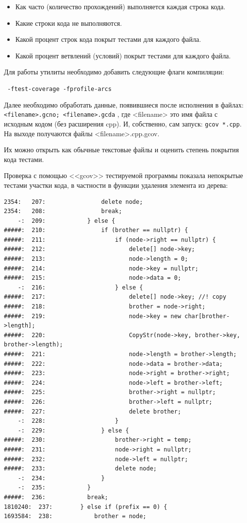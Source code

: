 \documentclass[12pt]{article}
\begin{document}
\begin{itemize}
\item Как часто (количество прохождений) выполняется каждая строка кода.
\item Какие строки кода не выполняются.
\item Какой процент строк кода покрыт тестами для каждого файла.
\item Какой процент ветвлений (условий) покрыт тестами для каждого файла.
\end{itemize}

Для работы утилиты необходимо добавить следующие флаги компиляции:

\lstinline| -ftest-coverage -fprofile-arcs|

Далее необходимо обработать данные, появившиеся после исполнения в файлах: \lstinline|<filename>.gcno; <filename>.gcda| , где <filename> это имя файла с исходным кодом (без расширения cpp). И, собственно, сам запуск: \lstinline|gcov *.cpp|.
На выходе получаются файлы <filename>.cpp.gcov.

Их можно открыть как обычные текстовые файлы и оценить степень покрытия кода тестами. 

Проверка с помощью <<gcov>> тестируемой программы показала непокрытые тестами участки кода, в частности в функции удаления элемента из дерева:

{\scriptsize
\begin{lstlisting}
2354:   207:                delete node;
2354:   208:                break;
    -:  209:            } else {
#####:  210:                if (brother == nullptr) {
#####:  211:                    if (node->right == nullptr) {
#####:  212:                        delete[] node->key;
#####:  213:                        node->length = 0;
#####:  214:                        node->key = nullptr;
#####:  215:                        node->data = 0;
    -:  216:                    } else {
#####:  217:                        delete[] node->key; //! copy
#####:  218:                        brother = node->right;
#####:  219:                        node->key = new char[brother->length];
#####:  220:                        CopyStr(node->key, brother->key, brother->length);
#####:  221:                        node->length = brother->length;
#####:  222:                        node->data = brother->data;
#####:  223:                        node->right = brother->right;
#####:  224:                        node->left = brother->left;
#####:  225:                        brother->right = nullptr;
#####:  226:                        brother->left = nullptr;
#####:  227:                        delete brother;
    -:  228:                    }
    -:  229:                } else {
#####:  230:                    brother->right = temp;
#####:  231:                    node->right = nullptr;
#####:  232:                    node->left = nullptr;
#####:  233:                    delete node;
    -:  234:                }
    -:  235:            }
#####:  236:            break;
1810240:  237:        } else if (prefix == 0) {
1693584:  238:            brother = node;
\end{lstlisting}}
\end{document}

